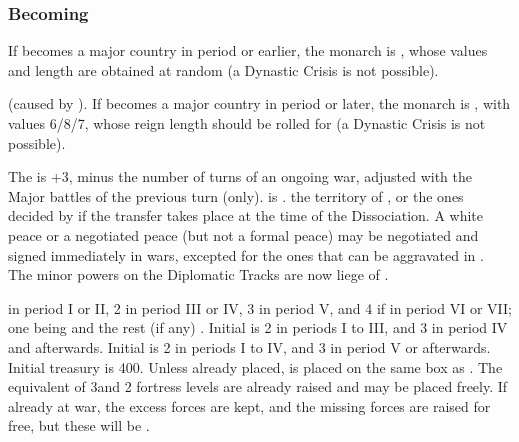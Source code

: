 \subsubsection{Becoming \paysmajeurAutriche}
 If \AUS becomes a major country in period
 or earlier, %
the monarch is , whose values and length are obtained
at random (a Dynastic Crisis is not possible).

 (caused by ). %
If \AUS becomes a major country in period  or later, the monarch is
, with values 6/8/7, whose reign length should be
rolled for (a Dynastic Crisis is not possible).

\bparag The \STAB is +3, minus the number of turns of an ongoing war, adjusted
with the Major battles of the previous turn (only).
\bparag \HAB is .
 the territory of \payshabsbourg, or the ones decided
by  if the transfer takes place at the time of the
Dissociation.
\aparag[Diplomacy] A white peace or a negotiated peace (but not a formal
peace) may be negotiated and signed immediately in wars, excepted for the ones
that can be aggravated in .
\bparag The minor powers on the Diplomatic Tracks are now liege of \AUS.

 \MNU in period I or II, 2 \MNU in period III or IV, 3 \MNU in period
V, and 4 if in period VI or VII; one being \facemoins and the rest (if any)
\faceplus. Initial \DTI is 2 in periods I to III, and 3 in period IV and
afterwards.  Initial \FTI is 2 in periods I to IV, and 3 in period V or
afterwards.
\bparag Initial treasury is 400\ducats.
\aparag[military]
\bparag Unless already placed,  is placed on the same
box as \SPA.
\bparag The equivalent of 3\ARMY\faceplus and 2 fortress levels are already
raised and may be placed freely. If already at war, the excess forces are
kept, and the missing forces are raised for free, but these will be
.


